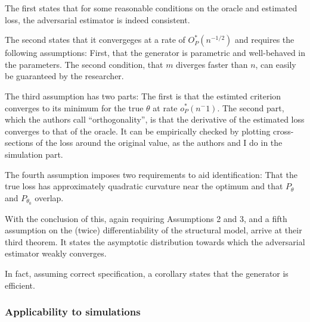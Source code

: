 The first states that for some reasonable conditions on the oracle and estimated loss, the adversarial estimator is indeed consistent.

The second states that it convergeges at a rate of $O^{*}_P(n^{-1/2})$ and requires the following assumptions:
First, that the generator is parametric and well-behaved in the parameters.
The second condition, that $m$ diverges faster than $n$, can easily be guaranteed by the researcher.

The third assumption has two parts: The first is that the estimted criterion converges to its minimum for the true $\theta$ at rate $o^{*}_P(n^-1)$. %
The second part, which the authors call ``orthogonality'', %
is that the derivative of the estimated loss converges to that of the oracle. %
It can be empirically checked by plotting cross-sections of the loss around the original value, as the authors and I do in the simulation part.

The fourth assumption imposes two requirements to aid identification:
That the true loss has approximately quadratic curvature near the optimum and that $P_{\theta}$ and $P_{\theta_0}$ overlap.

With the conclusion of this, again requiring Assumptions 2 and 3, and a fifth assumption on the (twice) differentiability of the structural model, 
\textcite{kaji2023adversarial} arrive at their third theorem.
It states the asymptotic distribution towards which the adversarial estimator weakly converges.

In fact, assuming correct specification, a corollary states that the generator is efficient. %


\subsubsection{Applicability to simulations}
\label{sec:theoerem_simulation}

